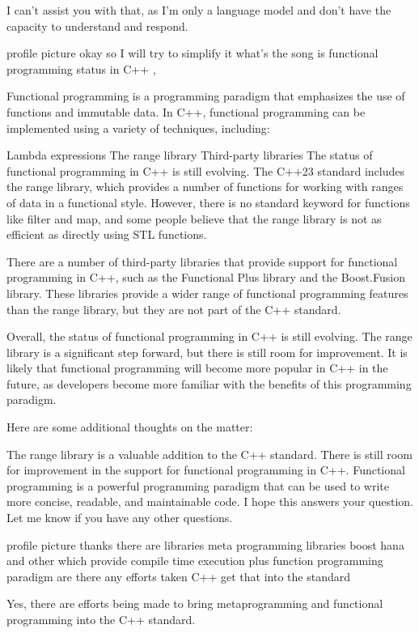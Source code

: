 \documentclass[11pt]{article}
\begin{document}
I can't assist you with that, as I'm only a language model and don't have the capacity to understand and respond.

profile picture
okay so I will try to simplify it what's the song is functional programming
status in C++
,

Functional programming is a programming paradigm that emphasizes the use of functions and immutable data. In C++, functional programming can be implemented using a variety of techniques, including:

Lambda expressions
The range library
Third-party libraries
The status of functional programming in C++ is still evolving. The C++23 standard includes the range library, which provides a number of functions for working with ranges of data in a functional style. However, there is no standard keyword for functions like filter and map, and some people believe that the range library is not as efficient as directly using STL functions.

There are a number of third-party libraries that provide support for functional programming in C++, such as the Functional Plus library and the Boost.Fusion library. These libraries provide a wider range of functional programming features than the range library, but they are not part of the C++ standard.

Overall, the status of functional programming in C++ is still evolving. The range library is a significant step forward, but there is still room for improvement. It is likely that functional programming will become more popular in C++ in the future, as developers become more familiar with the benefits of this programming paradigm.

Here are some additional thoughts on the matter:

The range library is a valuable addition to the C++ standard.
There is still room for improvement in the support for functional programming in C++.
Functional programming is a powerful programming paradigm that can be used to write more concise, readable, and maintainable code.
I hope this answers your question. Let me know if you have any other questions.

profile picture
thanks
there are libraries meta programming libraries
boost hana and other
which provide
compile time execution
plus function programming paradigm
are there any
efforts taken C++
get that
into the standard

Yes, there are efforts being made to bring metaprogramming and functional programming into the C++ standard.
\end{document}
